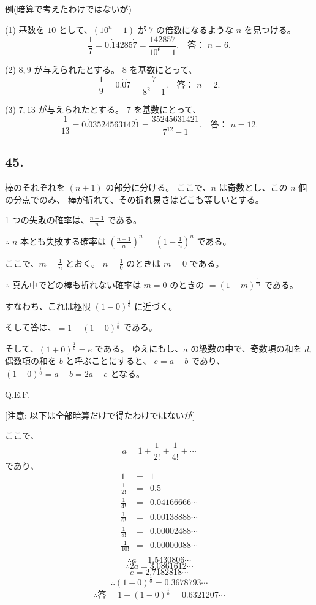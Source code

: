 例(暗算で考えたわけではないが)

(1)
基数を $10$ として、$(10^n - 1)$ が $7$ の倍数になるような
$n$ を見つける。
\[
\frac{1}{7} = 0. \dot{1} 4285 \dot{7}
= \frac{142857}{10^6 - 1}.
\quad \mbox{答： $n = 6$}.
\]

(2)
$8, 9$ が与えられたとする。
$8$ を基数にとって、
\[
\frac{1}{9} = 0. \dot{0} \dot{7} = \frac{7}{8^2 - 1}.
\quad \mbox{答： $n = 2$}.
\]

(3)
$7, 13$ が与えられたとする。
$7$ を基数にとって、
\[
\frac{1}{13} = 0. \dot{0} 3524563142 \dot{1}
= \frac{35245631421}{7^{12} - 1}.
\quad \mbox{答： $n = 12$}.
\]

\subsection*{45.}

棒のそれぞれを $(n + 1)$ の部分に分ける。
ここで、$n$ は奇数とし、この $n$ 個の分点でのみ、
棒が折れて、その折れ易さはどこも等しいとする。

 1 つの失敗の確率は、$\frac{n-1}{n}$ である。

$\therefore$ $n$ 本とも失敗する確率は
$\left(\frac{n-1}{n}\right)^n$ 
= $\left(1 - \frac{1}{n}\right)^n$ 
である。

ここで、$m = \frac{1}{n}$ とおく。
$n = \frac{1}{0}$ のときは $m = 0$ である。

$\therefore$
真ん中でどの棒も折れない確率は $m = 0$ のときの
$= (1 - m)^{\frac{1}{m}}$ である。

すなわち、これは極限 $(1 - 0)^\frac{1}{0}$ に近づく。

そして答は、$ = 1 - (1 - 0)^\frac{1}{0}$ である。

そして、$(1 + 0)^\frac{1}{0} = e$ である。
ゆえにもし、$a$ の級数の中で、奇数項の和を $d$,
偶数項の和を $b$ と呼ぶことにすると、
$e = a + b$ であり、$(1 - 0)^\frac{1}{0} = a - b = 2a - e$
となる。

Q.E.F.

[注意: 以下は全部暗算だけで得たわけではないが]

ここで、
\[
a = 1 + \frac{1}{2!} + \frac{1}{4!} + \cdots
\]
であり、
\begin{eqnarray*}
1 &=& 1\\
\frac{1}{2!} &=& 0.5\\
\frac{1}{4!} &=& 0.04166666 \cdots\\
\frac{1}{6!} &=& 0.00138888 \cdots\\
\frac{1}{8!} &=& 0.00002488 \cdots\\
\frac{1}{10!} &=& 0.00000088 \cdots\\
\end{eqnarray*}
\[
\therefore
a = 1.5430806\cdots
\]
\[
\therefore
2a = 3.0861612\cdots
\]
\[
e = 2.7182818 \cdots
\]
\[
\therefore
(1 - 0)^\frac{1}{0} = 0.3678793\cdots
\]
\[
\therefore
\mbox{答} = 1 - (1 - 0)^\frac{1}{0} = 0.6321207 \cdots
\]


